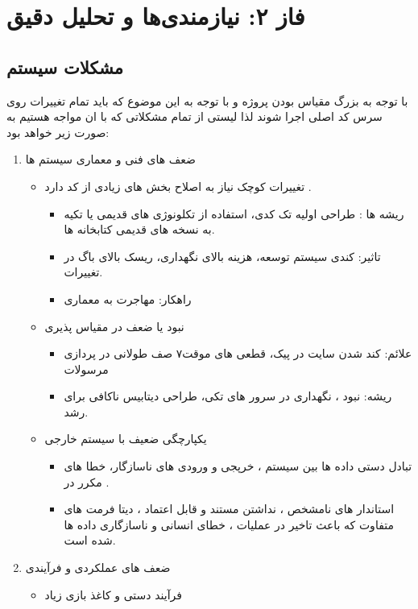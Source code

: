 \documentclass[12pt,a4paper]{report}
\begin{document}
\section{فاز ۲: نیازمندی‌ها و تحلیل دقیق} 
\subsection{مشکلات سیستم}
با توجه به بزرگ مقیاس بودن پروژه و با توجه به این موضوع که باید تمام تغییرات  روی سرس کد اصلی اجرا شوند لذا لیستی از تمام مشکلاتی که با ان مواجه هستیم به صورت زیر خواهد بود:

\begin{enumerate}
	\item ضعف های فنی و معماری سیستم ها 
	\begin{itemize}
		\item تغییرات کوچک نیاز به اصلاح بخش های زیادی از کد دارد .
\begin{itemize}
	\item 
ریشه ها : طراحی اولیه تک کدی، استفاده از تکلونوژی های قدیمی یا تکیه به نسخه های قدیمی کتابخانه ها.
	\item تاثیر: کندی سیستم توسعه، هزینه بالای نگهداری، ریسک بالای باگ در تغییرات.
	\item راهکار: مهاجرت به معماری 
\end{itemize} 
\item نبود یا ضعف در مقیاس پذیری
\begin{itemize}
\item علائم:
کند شدن سایت در پیک، قطعی های موقت۷ صف طولانی در پردازی مرسولات
\item
ریشه: نبود ، نگهداری  در سرور های تکی، طراحی دیتابیس ناکافی برای رشد.
\end{itemize} 
\item یکپارچگی ضعیف با سیستم خارجی 
\begin{itemize}
	\item 
تبادل دستی داده ها بین سیستم ، خرپجی و ورودی های ناسازگار، خطا های مکرر در .
	\item 
	استاندار های نامشخص ، نداشتن  مستند و قابل اعتماد ، دیتا فرمت های متفاوت  که باعث تاخیر در عملیات ، خطای انسانی و ناسازگاری داده ها شده است.
\end{itemize}
	\end{itemize}
	\item ضعف های عملکردی و فرآیندی
\begin{itemize}
	\item فرآیند دستی و کاغذ بازی زیاد

\end{itemize}
\end{enumerate}
\end{document}
